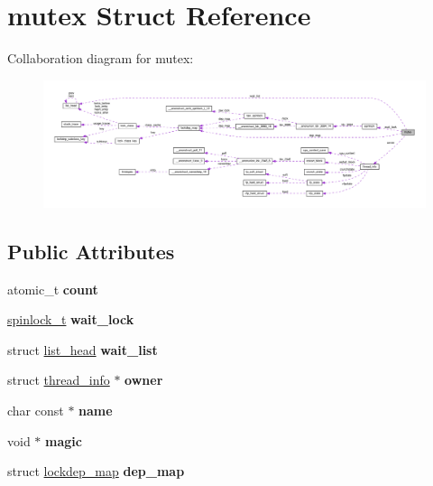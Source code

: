 \hypertarget{structmutex}{}\section{mutex Struct Reference}
\label{structmutex}


Collaboration diagram for mutex\+:
\nopagebreak
\begin{figure}[H]
\begin{center}
\leavevmode
\includegraphics[width=350pt]{structmutex__coll__graph}
\end{center}
\end{figure}
\subsection*{Public Attributes}
\begin{DoxyCompactItemize}
\item 
\hypertarget{structmutex_afdffc6a08e8f95e90a94340b79d2a039}{}atomic\+\_\+t {\bfseries count}\label{structmutex_afdffc6a08e8f95e90a94340b79d2a039}

\item 
\hypertarget{structmutex_a55ebf938a9b5ac84ee2aff30ac383710}{}\hyperlink{structspinlock}{spinlock\+\_\+t} {\bfseries wait\+\_\+lock}\label{structmutex_a55ebf938a9b5ac84ee2aff30ac383710}

\item 
\hypertarget{structmutex_a8e74e9a4fe0b2bebbc8346158ca5a8f9}{}struct \hyperlink{structlist__head}{list\+\_\+head} {\bfseries wait\+\_\+list}\label{structmutex_a8e74e9a4fe0b2bebbc8346158ca5a8f9}

\item 
\hypertarget{structmutex_a2618e881fedd671e0ea9e906261fa435}{}struct \hyperlink{structthread__info}{thread\+\_\+info} $\ast$ {\bfseries owner}\label{structmutex_a2618e881fedd671e0ea9e906261fa435}

\item 
\hypertarget{structmutex_a3811cf21c148fab214427774c348c7a7}{}char const $\ast$ {\bfseries name}\label{structmutex_a3811cf21c148fab214427774c348c7a7}

\item 
\hypertarget{structmutex_af3432821ea6f9ac1a083ad659874689d}{}void $\ast$ {\bfseries magic}\label{structmutex_af3432821ea6f9ac1a083ad659874689d}

\item 
\hypertarget{structmutex_a71e7ac54f837da85acfdc75bf4663c3a}{}struct \hyperlink{structlockdep__map}{lockdep\+\_\+map} {\bfseries dep\+\_\+map}\label{structmutex_a71e7ac54f837da85acfdc75bf4663c3a}

\end{DoxyCompactItemize}


